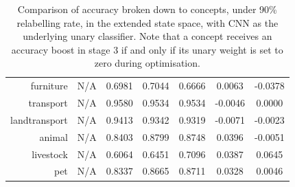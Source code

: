 \documentclass[11pt,a4paper]{book}
\begin{document}
\begin{table}[htbp]
\begin{tabular}{r|c|c|c|c|c|c}
furniture     & N/A    & 0.6981 & 0.7044 & 0.6666 & 0.0063 & -0.0378\\
transport     & N/A    & 0.9580 & 0.9534 & 0.9534 & -0.0046 & 0.0000\\
landtransport & N/A    & 0.9413 & 0.9342 & 0.9319 & -0.0071 & -0.0023\\
animal        & N/A    & 0.8403 & 0.8799 & 0.8748 & 0.0396 & -0.0051\\
livestock     & N/A    & 0.6064 & 0.6451 & 0.7096 & 0.0387 & 0.0645\\
pet           & N/A    & 0.8337 & 0.8665 & 0.8711 & 0.0328 & 0.0046
\end{tabular}
\caption{Comparison of accuracy broken down to concepts, under 90\% relabelling rate, in the extended state space, with CNN as the underlying unary classifier. Note that a concept receives an accuracy boost in stage 3 if and only if its unary weight is set to zero during optimisation.}
\label{tab:cnn90acc}
\end{table}
\end{document}
